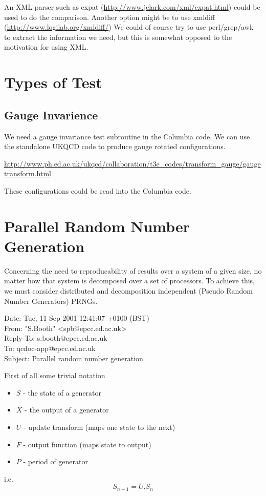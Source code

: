 \documentclass[12pt]{article}
\begin{document}
An XML parser such as expat (\href{http://www.jclark.com/xml/expat.html}{http://www.jclark.com/xml/expat.html})
could be used to do the comparison.  Another option might be to use xmldiff 
(\href{http://www.logilab.org/xmldiff/}{http://www.logilab.org/xmldiff/})
We could of course try to use perl/grep/awk to extract the 
information we need, but this is somewhat opposed to the motivation for using XML.


\section{Types of Test}

\subsection{Gauge Invarience}
We need a gauge invariance test subroutine in the Columbia code.  We can use the standalone UKQCD code to  produce gauge rotated configurations. 

   \href{http://www.ph.ed.ac.uk/ukqcd/collaboration/t3e_codes/transform_gauge/gaugetransform.html}{http://www.ph.ed.ac.uk/ukqcd/collaboration/t3e\_codes/transform\_gauge/gaugetransform.html}

These configurations could be read into the Columbia code.


\section{Parallel Random Number Generation}
Concerning the need to reproducability of results over a system of a given
size, no matter how that system is decomposed over a set of processors.
To achieve this, we must consider distributed and decomposition independent 
(Pseudo Random Number Generators) PRNGs.

Date: Tue, 11 Sep 2001 12:41:07 +0100 (BST)\\
From: "S.Booth" <spb@epcc.ed.ac.uk>\\
Reply-To: s.booth@epcc.ed.ac.uk\\
To: qcdoc-app@epcc.ed.ac.uk\\
Subject: Parallel random number generation

First of all some trivial notation
\begin{itemize}
 \item{$S$} - the state of a generator
 \item{$X$} - the output of a generator
 \item{$U$} - update transform (maps one state to the next)
 \item{$F$} - output function (maps state to output)
 \item{$P$} - period of generator
\end{itemize}
i.e.
\begin{equation}
 S_{n+1} = U.S_{n}
\end{equation}
\end{document}
